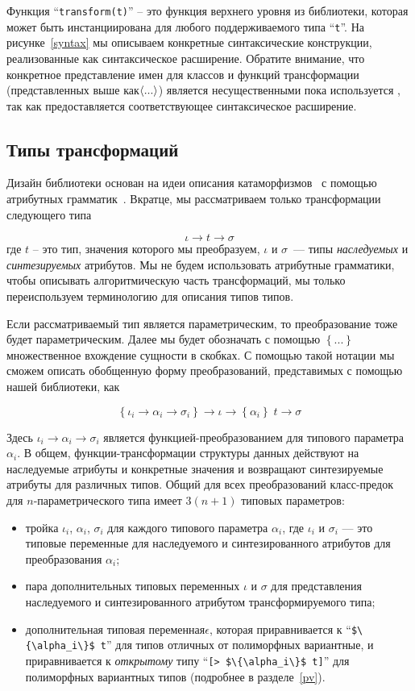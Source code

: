 Функция ``\lstinline{transform(t)}'' -- это функция верхнего уровня из библиотеки, которая может быть инстанциирована для любого поддерживаемого типа  ``\lstinline{t}''. На рисунке~\ref{syntax} мы описываем конкретные синтаксические конструкции, реализованные как синтаксическое расширение. Обратите внимание, что конкретное представление имен для классов и функций трансформации (представленных выше как$\left<...\right>$) является несущественными пока используется , так как предоставляется соответствующее синтаксическое расширение.

\subsection{Типы трансформаций}

Дизайн библиотеки основан на идеи описания катаморфизмов~\cite{Bananas} с помощью атрибутных 
грамматик~\cite{AGKnuth,AGSwierstra,ObjectAlgebrasAttribute}.
Вкратце, мы рассматриваем только трансформации следующего типа

\[
\iota \to t \to \sigma
\]
где $t$ -- это тип, значения которого мы преобразуем, $\iota$ и $\sigma$~--- типы \emph{наследуемых} и \emph{синтезируемых} атрибутов. 
Мы не будем использовать атрибутные грамматики, чтобы описывать алгоритмическую часть трансформаций, мы только переиспользуем терминологию для описания типов типов. 

Если рассматриваемый тип является параметрическим, то преобразование тоже будет параметрическим. Далее мы будет обозначать с помощью
$\left\{...\right\}$ множественное вхождение сущности в скобках. С помощью такой нотации мы сможем описать обобщенную форму преобразований, представимых с помощью нашей библиотеки, как

\[
  \left\{\iota_i \to \alpha_i \to \sigma_i\right\}\to\iota \to\left\{\alpha_i\right\}\;t \to \sigma
\]

Здесь $\iota_i\to\alpha_i\to\sigma_i$ является функцией-преобразованием для типового параметра $\alpha_i$. В общем, функции-трансформации структуры данных действуют на наследуемые атрибуты и конкретные значения и возвращают синтезируемые атрибуты для различных типов. Общий для всех преобразований класс-предок для $n$-параметрического типа имеет $3(n+1)$ типовых параметров:

\begin{itemize}
\item тройка $\iota_i$, $\alpha_i$, $\sigma_i$ для каждого типового параметра $\alpha_i$, где $\iota_i$ и $\sigma_i$ --- это типовые переменные для наследуемого и синтезированного атрибутов для преобразования  $\alpha_i$;
\item пара дополнительных типовых переменных $\iota$ и $\sigma$ для представления наследуемого и синтезированного атрибутом трансформируемого типа;
\item дополнительная типовая переменная$\epsilon$, которая приравнивается к ``\lstinline|$\{\alpha_i\}$ t|'' для типов отличных от полиморфных вариантные, и приравнивается к \emph{открытому} типу ``\lstinline|[> $\{\alpha_i\}$ t]|'' для полиморфных вариантных типов (подробнее в 
разделе~\ref{pv}).
\end{itemize}

